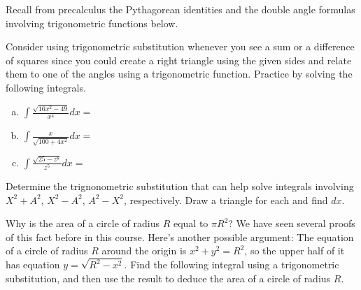 \documentclass[answers]{exam}
\begin{document}
\begin{questions}
	
\question Recall from precalculus the Pythagorean identities and the double angle formulas involving trigonometric functions below.

\vspace{2in}


\question Consider using trigonometric substitution whenever you see a sum or a difference of squares since you could create a right triangle using the given sides and relate them to one of the angles using a trigonometric function. Practice by solving the following integrals.

\begin{enumerate}[(a)]
	
	\item $\displaystyle \int \frac{\sqrt{16x^2-49}}{x^4} dx =$
	
	\hfill \break
	\hfill \break
	\hfill \break
	\hfill \break
	\hfill \break
	\hfill \break
	\hfill \break
	\hfill \break
	\hfill \break
	\hfill \break
	\hfill \break
	\hfill \break
	
	\item $\displaystyle \int \frac{x}{\sqrt{100+4x^2}}dx = $
	
	\hfill \break
	\hfill \break
	\hfill \break
	\hfill \break
	\hfill \break
	\hfill \break
	\hfill \break
	\hfill \break
	\hfill \break
	\hfill \break
	\hfill \break
	\hfill \break
	
	
	\item $\displaystyle \int \frac{\sqrt{25-z^8}}{z^5} dx =$ 
	
	\hfill \break
	\hfill \break
	\hfill \break
	\hfill \break
	\hfill \break
	\hfill \break
	\hfill \break
	\hfill \break
	\hfill \break
	\hfill \break
	
	
\end{enumerate}

\question Determine the trignonometric substitution that can help solve integrals involving $X^2+A^2$, $X^2-A^2$, $A^2-X^2$, respectively. Draw a triangle for each and find $dx$.

\vspace{3in}

\question Why is the area of a circle of radius $R$ equal to $\pi R^2$? We have seen several proofs of this fact before in this course. Here's another possible argument: The equation of a circle of radius $R$ around the origin is $x^2+y^2=R^2$, so the upper half of it has equation $y = \sqrt{R^2-x^2}$. Find the following integral using a trigonometric substitution, and then use the result to deduce the area of a circle of radius $R$.\\


\end{questions}
\end{document}
